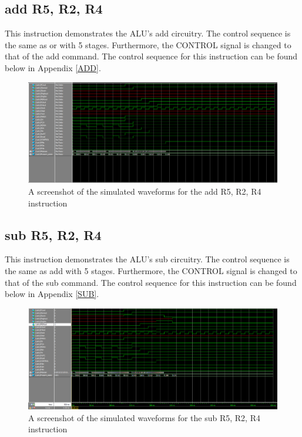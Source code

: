 \documentclass{article}
\begin{document}
    \subsection{add R5, R2, R4}
     This instruction demonstrates the ALU's add circuitry. The control sequence is the same as or with 5 stages. Furthermore, the CONTROL signal is changed to that of the add command. The control sequence for this instruction can be found below in Appendix \ref{ADD}.
     
    \begin{figure}[h!]
        \begin{center}
            \includegraphics[width=13cm]{add}
            \caption{A screenshot of the simulated waveforms for the add R5, R2, R4 instruction}
        \end{center}
    \end{figure}
     
    \subsection{sub R5, R2, R4}
     This instruction demonstrates the ALU's sub circuitry. The control sequence is the same as add with 5 stages. Furthermore, the CONTROL signal is changed to that of the sub command. The control sequence for this instruction can be found below in Appendix \ref{SUB}.
     
    \begin{figure}[h!]
        \begin{center}
            \includegraphics[width=13cm]{sub}
            \caption{A screenshot of the simulated waveforms for the sub R5, R2, R4 instruction}
        \end{center}
    \end{figure}
     
\end{document}
